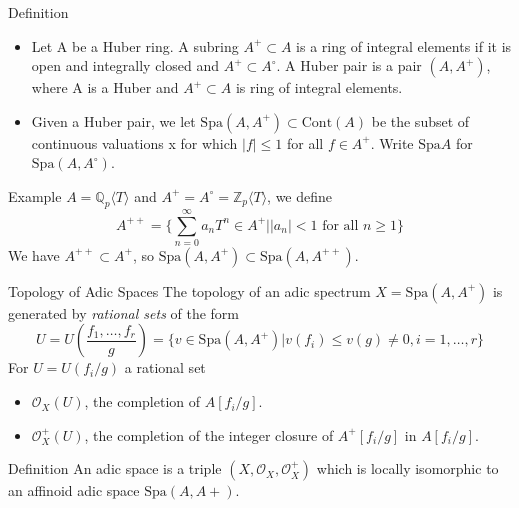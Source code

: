 \documentclass[aspectratio=1610]{ctexbeamer}
\def  \Spa      {\mathrm{Spa}}
\def  \co       {\mathcal{O}}
\def  \bq       {\mathbb{Q}}
\def  \bz       {\mathbb{Z}}
\begin{document}
\begin{frame}
\begin{block}{Definition}
	
	\begin{itemize}
	
	\item Let A be a Huber ring. A subring $A^+ \subset A$ is a ring of integral elements if it is open and integrally closed and $A^+ \subset A^{\circ}$. A Huber pair is a pair $(A, A^+)$, where A is a Huber and $A^+ \subset A$ is ring of integral elements.	

   \item 	Given a Huber pair, we let $\Spa(A, A^+) \subset \mathrm{Cont}(A)$ be the subset of continuous valuations x for which $|f| \leq 1$ for all $f \in A^+$. Write $\Spa A$  for $\Spa(A, A^{\circ})$.
	
	\end{itemize}
\end{block}




\begin{block}{Example}
	$A= \bq_p \langle T\rangle$ and $A^+  = A^{\circ} = \bz_p \langle T \rangle$, we define
	$$
	A^{++} = \{\sum_{n=0}^{\infty} a_n T^n \in A^{+}| |a_n| < 1 \text{ for all } n \geq 1\}
	$$
	We have $A^{++} \subset A^{+}$, so $\Spa(A, A^+) \subset \Spa(A, A^{++})$. 
\end{block}

\end{frame}


\begin{frame}{Topology of Adic Spaces}
	The topology of an adic spectrum $X=\Spa(A, A^+)$ is generated by  \emph{rational sets} of the form
	$$
	U=U(\frac{f_1, \dots, f_r}{g}) = \{ v \in \Spa(A, A^+)| v(f_i) \leq v(g) \neq 0, i=1, \dots, r\}
	$$
	For $U= U(f_i/g)$ a rational set
	\begin{itemize}
		\item $\co_X(U)$,  the completion of $A[f_i/g]$.
		\item $\co_X^+(U)$, the completion of the integer closure of $A^+[f_i/g]$ in $A[f_i/g]$.
	\end{itemize}
	\begin{block}{Definition}
		An  adic space is a triple $(X, \co_X, \co^+_X)$ which is locally isomorphic to an affinoid adic space $\Spa(A, A+)$.
	\end{block}

 
\end{frame}
\end{document}
